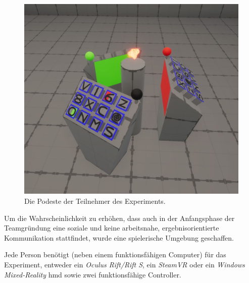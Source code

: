 \documentclass[a4paper,11pt]{article}%
\renewcommand{\\}{\vspace*{0.5\baselineskip} \newline}
\begin{document}
{\begin{figure}[h]
		\begin{footnotesize}
			\includegraphics[width=\textwidth]{Abbildungen/Podeste.JPG}	
			\caption[Die Podeste der Teilnehmer]{Die Podeste der Teilnehmer des Experiments.}
			\label{Podeste}
		\end{footnotesize}
	\end{figure}

Um die Wahrscheinlichkeit zu erhöhen, dass auch in der Anfangsphase der Teamgründung eine soziale und keine arbeitsnahe, ergebnisorientierte Kommunikation stattfindet, wurde eine spielerische Umgebung geschaffen.

Jede Person benötigt (neben einem funktionsfähigen Computer) für das Experiment, entweder ein \textit{Oculus Rift/Rift S}, ein \textit{SteamVR} oder ein \textit{Windows Mixed-Reality} \ac{hmd} sowie zwei funktionsfähige Controller.

}
\end{document}
